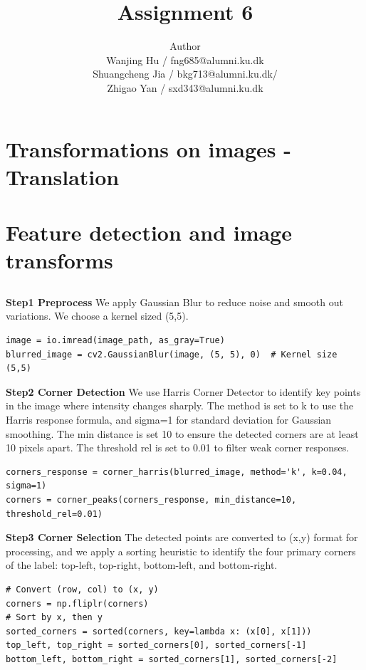 \documentclass[12pt]{article}
\title{Assignment 6}
\author{Author \\
 Wanjing Hu / fng685@alumni.ku.dk  \\
 Shuangcheng Jia / bkg713@alumni.ku.dk/   \\
 Zhigao Yan / sxd343@alumni.ku.dk  \\
}
\begin{document}
\maketitle

\section{Transformations on images - Translation}


\section{Feature detection and image transforms}
\subsection{}

\textbf{Step1 Preprocess}
We apply Gaussian Blur to reduce noise and smooth out variations. We choose a kernel sized (5,5).
\begin{lstlisting}
image = io.imread(image_path, as_gray=True)
blurred_image = cv2.GaussianBlur(image, (5, 5), 0)  # Kernel size (5,5)
\end{lstlisting}


\textbf{Step2 Corner Detection}
We use Harris Corner Detector to identify key points in the image where intensity changes sharply. The method is set to k to use the Harris response formula, and sigma=1 for standard deviation for Gaussian smoothing. The min distance is set 10 to ensure the detected corners are at least 10 pixels apart. The threshold rel is set to 0.01 to filter weak corner responses.
\begin{lstlisting}
corners_response = corner_harris(blurred_image, method='k', k=0.04, sigma=1)
corners = corner_peaks(corners_response, min_distance=10, threshold_rel=0.01)
\end{lstlisting}

\textbf{Step3 Corner Selection}
The detected points are converted to (x,y) format for processing, and we apply a sorting heuristic  to identify the four primary corners of the label: top-left, top-right, bottom-left, and bottom-right.
\begin{lstlisting}
# Convert (row, col) to (x, y)
corners = np.fliplr(corners)   
# Sort by x, then y
sorted_corners = sorted(corners, key=lambda x: (x[0], x[1])) 
top_left, top_right = sorted_corners[0], sorted_corners[-1]
bottom_left, bottom_right = sorted_corners[1], sorted_corners[-2]
\end{lstlisting}
\end{document}
